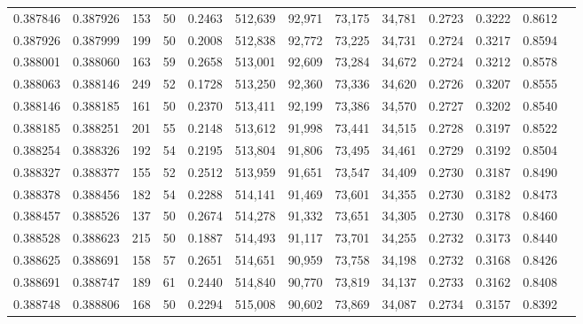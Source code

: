 \begin{tabular}{rrrrrrrrrrrrr}
0.387846 & 0.387926 &   153 &  50 &                                     0.2463 & 512,639 &  92,971 &  73,175 &  34,781 & 0.2723 & 0.3222 & 0.8612 \\
0.387926 & 0.387999 &   199 &  50 &                                     0.2008 & 512,838 &  92,772 &  73,225 &  34,731 & 0.2724 & 0.3217 & 0.8594 \\
0.388001 & 0.388060 &   163 &  59 &                                     0.2658 & 513,001 &  92,609 &  73,284 &  34,672 & 0.2724 & 0.3212 & 0.8578 \\
0.388063 & 0.388146 &   249 &  52 &                                     0.1728 & 513,250 &  92,360 &  73,336 &  34,620 & 0.2726 & 0.3207 & 0.8555 \\
0.388146 & 0.388185 &   161 &  50 &                                     0.2370 & 513,411 &  92,199 &  73,386 &  34,570 & 0.2727 & 0.3202 & 0.8540 \\
0.388185 & 0.388251 &   201 &  55 &                                     0.2148 & 513,612 &  91,998 &  73,441 &  34,515 & 0.2728 & 0.3197 & 0.8522 \\
0.388254 & 0.388326 &   192 &  54 &                                     0.2195 & 513,804 &  91,806 &  73,495 &  34,461 & 0.2729 & 0.3192 & 0.8504 \\
0.388327 & 0.388377 &   155 &  52 &                                     0.2512 & 513,959 &  91,651 &  73,547 &  34,409 & 0.2730 & 0.3187 & 0.8490 \\
0.388378 & 0.388456 &   182 &  54 &                                     0.2288 & 514,141 &  91,469 &  73,601 &  34,355 & 0.2730 & 0.3182 & 0.8473 \\
0.388457 & 0.388526 &   137 &  50 &                                     0.2674 & 514,278 &  91,332 &  73,651 &  34,305 & 0.2730 & 0.3178 & 0.8460 \\
0.388528 & 0.388623 &   215 &  50 &                                     0.1887 & 514,493 &  91,117 &  73,701 &  34,255 & 0.2732 & 0.3173 & 0.8440 \\
0.388625 & 0.388691 &   158 &  57 &                                     0.2651 & 514,651 &  90,959 &  73,758 &  34,198 & 0.2732 & 0.3168 & 0.8426 \\
0.388691 & 0.388747 &   189 &  61 &                                     0.2440 & 514,840 &  90,770 &  73,819 &  34,137 & 0.2733 & 0.3162 & 0.8408 \\
0.388748 & 0.388806 &   168 &  50 &                                     0.2294 & 515,008 &  90,602 &  73,869 &  34,087 & 0.2734 & 0.3157 & 0.8392 \\

\end{tabular}
